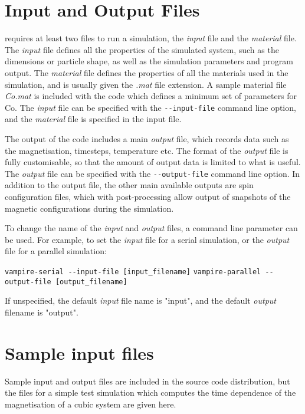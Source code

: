 \section*{Input and Output Files}
\vampire requires at least two files to run a simulation, the \textit{input} file and the \textit{material} file. The \textit{input} file defines all the properties of the simulated system, such as the dimensions or particle shape, as well as the simulation parameters and program output. The \textit{material} file defines the properties of all the materials used in the simulation, and is usually given the \textit{.mat} file extension. A sample material file \textit{Co.mat} is included with the code which defines a minimum set of parameters for Co. The \textit{input} file can be specified with the \verb|--input-file| command line option, and the \textit{material} file is specified in the input file.


The output of the code includes a main \textit{output} file, which records data such as the magnetisation, timesteps, temperature etc. The format of the \textit{output} file is fully customisable, so that the amount of output data is limited to what is useful. The \textit{output} file can be specified with the \verb|--output-file| command line option. In addition to the output file, the other main available outputs are spin configuration files, which with post-processing allow output of snapshots of the magnetic configurations during the simulation.


To change the name of the \textit{input} and \textit{output} files, a command line parameter can be used. For example, to set the \textit{input} file for a serial simulation, or the \textit{output} file for a parallel simulation:

\noindent
\begin{minipage}[c]{\textwidth}
\centering
	\begin{minipage}[c]{0.8\textwidth}
        \raggedright
\verb|vampire-serial --input-file [input_filename]|
\verb|vampire-parallel --output-file [output_filename]|
        \end{minipage}
\end{minipage}

If unspecified, the default \textit{input} file name is "input", and the default \textit{output} filename is "output".


\section*{Sample input files}
Sample input and output files are included in the source code distribution, but the files for a simple test simulation which computes the time dependence of the magnetisation of a cubic system are given here.

